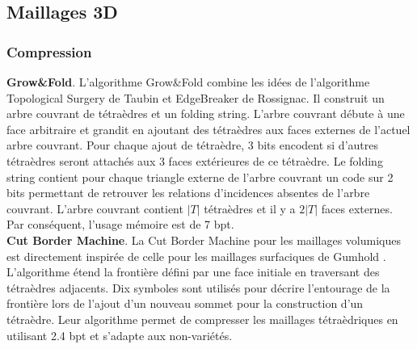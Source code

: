 \documentclass[a4paper,11pt,openany]{article}
\begin{document}
\subsection{Maillages 3D}
\subsubsection{Compression}
\noindent
\textbf{Grow\&Fold}. L'algorithme Grow\&Fold \cite{grow_and_fold} combine les idées de l'algorithme Topological Surgery \cite{topological_surgery} de Taubin et EdgeBreaker \cite{edgebreaker} de Rossignac. Il construit un arbre couvrant de tétraèdres et un folding string. L'arbre couvrant débute à une face arbitraire et grandit en ajoutant des tétraèdres aux faces externes de l'actuel arbre couvrant. Pour chaque ajout de tétraèdre, 3 bits encodent si d'autres tétraèdres seront attachés aux 3 faces extérieures de ce tétraèdre. Le folding string contient pour chaque triangle externe de l'arbre couvrant un code sur 2 bits permettant de retrouver les relations d'incidences absentes de l'arbre couvrant. L'arbre couvrant contient $|T|$ tétraèdres et il y a $2|T|$ faces externes. Par conséquent, l'usage mémoire est de 7 bpt.\\
\textbf{Cut Border Machine}. La Cut Border Machine pour les maillages volumiques \cite{cut_border_machine_2d} est directement inspirée de celle pour les maillages surfaciques de Gumhold \cite{cut_border_machine_3d}. L'algorithme étend la frontière défini par une face initiale en traversant des tétraèdres adjacents. Dix symboles sont utilisés pour décrire l'entourage de la frontière lors de l'ajout d'un nouveau sommet pour la construction d'un tétraèdre. Leur algorithme permet de compresser les maillages tétraèdriques en utilisant 2.4 bpt et s'adapte aux non-variétés.
 
\end{document}
